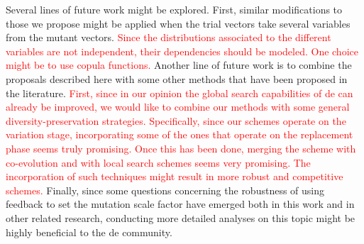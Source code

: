 \documentclass[preprint,3p]{elsarticle}
\newcommand{\DE}{{\sc de}}
\begin{document}
Several lines of future work might be explored.
%
First, similar modifications to those we propose might be applied when the trial
vectors take several variables from the mutant vectors.
%
\textcolor{red}{
Since the distributions associated to the different variables are not independent, 
their dependencies should be modeled.
%
One choice might be to use copula functions.
}
%
%
Another line of future work is to combine the proposals described here with some other methods
that have been proposed in the literature.
\textcolor{red}{
%
First, since in our opinion the global search capabilities of \DE{} can already be improved, we would like to combine
our methods with some general diversity-preservation strategies.
%
Specifically, since our schemes operate on the variation stage, incorporating some of the ones that operate
on the replacement phase seems truly promising.
%
Once this has been done, merging the scheme with co-evolution and with local search schemes
seems very promising.
%
The incorporation of such techniques might result in more robust and competitive schemes.
}
%
Finally, since some questions concerning the robustness of using feedback to set the mutation scale factor
have emerged both in this work and in other related research, conducting more detailed analyses on this topic might
be highly beneficial to the \DE{} community.


%
\end{document}
